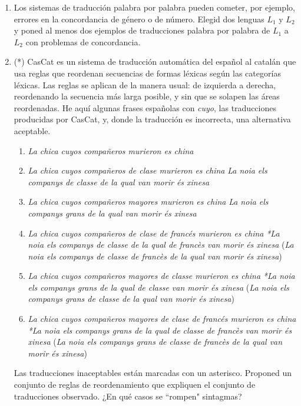\begin{enumerate} \item Los sistemas de traducción palabra por palabra pueden cometer, por ejemplo, errores en la concordancia de género o de número. Elegid dos lenguas $L_1$ y $L_2$ y poned al menos dos ejemplos de traducciones palabra por palabra de $L_1$ a $L_2$ con problemas de concordancia. 

\item (*) \label{ex:cascat} CasCat es un sistema de traducción automática del español al catalán que usa reglas que reordenan secuencias de formas léxicas según las categorías léxicas. Las reglas se aplican de la manera usual: de izquierda a derecha, reordenando la secuencia más larga posible, y sin que se solapen las áreas reordenadas. He aquí algunas frases españolas con {\em cuyo}, las traducciones producidas por CasCat, y, donde la traducción es incorrecta, una alternativa aceptable. \begin{enumerate} \item \emph{La chica cuyos compañeros murieron es china}  \item \emph{La chica cuyos compañeros de clase murieron es china} \newline \emph{La noia els companys de classe de la qual van morir és xinesa} \item \emph{La chica cuyos compañeros mayores murieron es china} \newline \emph{La noia els companys grans de la qual van morir és xinesa} \item \emph{La chica cuyos compañeros de clase de francés murieron es china} \newline \emph{*La noia els companys de classe de la qual de francès van morir és xinesa} \newline (\emph{La noia els companys de classe de francès de la qual van morir és xinesa}) \item \emph{La chica cuyos compañeros mayores de classe murieron es china} \newline \emph{*La noia els companys grans de la qual de classe van morir és xinesa} \newline (\emph{La noia els companys grans de classe de la qual van morir és xinesa}) \item \emph{La chica cuyos compañeros mayores de clase de francés murieron es china} \newline \emph{*La noia els companys grans de la qual de classe de francès van morir és xinesa} \newline(\emph{La noia els companys grans de classe de francès de la qual van morir és xinesa}) \end{enumerate} Las traducciones inaceptables están marcadas con un asterisco. Proponed un conjunto de reglas de reordenamiento que expliquen el conjunto de traducciones observado. ¿En qué casos se ``rompen" sintagmas? 


\end{enumerate}
